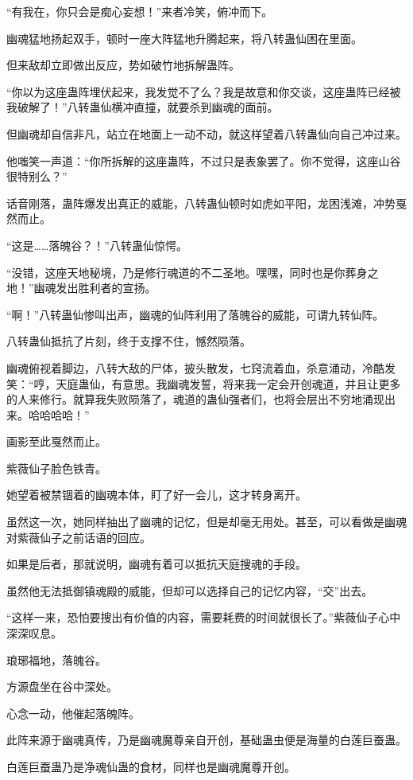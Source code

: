 \begin{this_body}
“有我在，你只会是痴心妄想！”来者冷笑，俯冲而下。

幽魂猛地扬起双手，顿时一座大阵猛地升腾起来，将八转蛊仙困在里面。

但来敌却立即做出反应，势如破竹地拆解蛊阵。

“你以为这座蛊阵埋伏起来，我发觉不了么？我是故意和你交谈，这座蛊阵已经被我破解了！”八转蛊仙横冲直撞，就要杀到幽魂的面前。

但幽魂却自信非凡，站立在地面上一动不动，就这样望着八转蛊仙向自己冲过来。

他嗤笑一声道：“你所拆解的这座蛊阵，不过只是表象罢了。你不觉得，这座山谷很特别么？”

话音刚落，蛊阵爆发出真正的威能，八转蛊仙顿时如虎如平阳，龙困浅滩，冲势戛然而止。

“这是……落魄谷？！”八转蛊仙惊愕。

“没错，这座天地秘境，乃是修行魂道的不二圣地。嘿嘿，同时也是你葬身之地！”幽魂发出胜利者的宣扬。

“啊！”八转蛊仙惨叫出声，幽魂的仙阵利用了落魄谷的威能，可谓九转仙阵。

八转蛊仙抵抗了片刻，终于支撑不住，憾然陨落。

幽魂俯视着脚边，八转大敌的尸体，披头散发，七窍流着血，杀意涌动，冷酷发笑：“哼，天庭蛊仙，有意思。我幽魂发誓，将来我一定会开创魂道，并且让更多的人来修行。就算我失败陨落了，魂道的蛊仙强者们，也将会层出不穷地涌现出来。哈哈哈哈！”

画影至此戛然而止。

紫薇仙子脸色铁青。

她望着被禁锢着的幽魂本体，盯了好一会儿，这才转身离开。

虽然这一次，她同样抽出了幽魂的记忆，但是却毫无用处。甚至，可以看做是幽魂对紫薇仙子之前话语的回应。

如果是后者，那就说明，幽魂有着可以抵抗天庭搜魂的手段。

虽然他无法抵御镇魂殿的威能，但却可以选择自己的记忆内容，“交”出去。

“这样一来，恐怕要搜出有价值的内容，需要耗费的时间就很长了。”紫薇仙子心中深深叹息。

琅琊福地，落魄谷。

方源盘坐在谷中深处。

心念一动，他催起落魄阵。

此阵来源于幽魂真传，乃是幽魂魔尊亲自开创，基础蛊虫便是海量的白莲巨蚕蛊。

白莲巨蚕蛊乃是净魂仙蛊的食材，同样也是幽魂魔尊开创。


\end{this_body}
